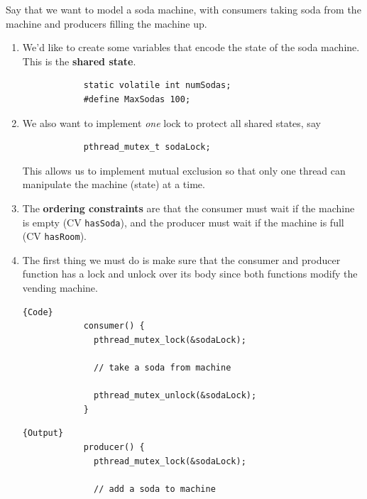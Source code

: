 \documentclass{article}
\newcounter{example}[section]
\newcounter{code}[section]
\begin{document}
    \begin{example}
      \label{ex:soda-machine}
      Say that we want to model a soda machine, with consumers taking soda from the machine and producers filling the machine up. 
      \begin{enumerate}
        \item We'd like to create some variables that encode the state of the soda machine. This is the \textbf{shared state}. 
          \begin{lstlisting}
            static volatile int numSodas; 
            #define MaxSodas 100; 
          \end{lstlisting}

        \item We also want to implement \textit{one} lock to protect all shared states, say 
          \begin{lstlisting}
            pthread_mutex_t sodaLock; 
          \end{lstlisting}
          This allows us to implement mutual exclusion so that only one thread can manipulate the machine (state) at a time. 

        \item The \textbf{ordering constraints} are that the consumer must wait if the machine is empty (CV \texttt{hasSoda}), and the producer must wait if the machine is full (CV \texttt{hasRoom}). 

        \item The first thing we must do is make sure that the consumer and producer function has a lock and unlock over its body since both functions modify the vending machine. 

          \noindent\begin{minipage}{.5\linewidth}
          \begin{lstlisting}[]{Code}
            consumer() {
              pthread_mutex_lock(&sodaLock); 

              // take a soda from machine

              pthread_mutex_unlock(&sodaLock); 
            }
          \end{lstlisting}
          \end{minipage}
          \hfill
          \begin{minipage}{.49\linewidth}
          \begin{lstlisting}[]{Output}
            producer() {
              pthread_mutex_lock(&sodaLock); 

              // add a soda to machine


\end{lstlisting}
\end{minipage}
\end{enumerate}
\end{example}
\end{document}
